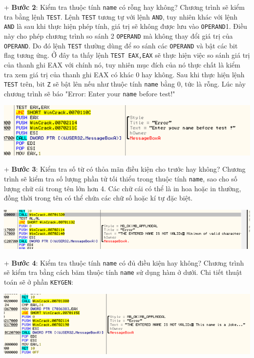 + \textbf{Bước 2}: Kiểm tra thuộc tính \texttt{name} có rỗng hay không? Chương trình sẽ kiểm tra bằng lệnh \texttt{TEST}. Lệnh \texttt{TEST} tương tự với lệnh \texttt{AND}, tuy nhiên khác với lệnh \texttt{AND} là sau khi thực hiện phép tính, giá trị sẽ không được lưu vào \texttt{OPERAND}1. Điều này cho phép chương trình so sánh 2 \texttt{OPERAND} mà không thay đổi giá trị của \texttt{OPERAND}. Do đó lệnh \texttt{TEST} thường dùng để so sánh các \texttt{OPERAND} và bật các bit flag tương ứng. Ở đây ta thấy lệnh \texttt{TEST EAX,EAX} sẽ thực hiện việc so sánh giá trị của thanh ghi EAX với chính nó, tuy nhiên mục đích của nó thực chất là kiểm tra xem giá trị của thanh ghi EAX có khác 0 hay không. Sau khi thực hiện lệnh \texttt{TEST} trên, bit \texttt{Z} sẽ bật lên nếu như thuộc tính \texttt{name} bằng 0, tức là rỗng. Lúc này chương trình sẽ báo "Error: Enter your \texttt{name} before test!"\\
\begin{center}
    \includegraphics[width=\textwidth]{img/file-2/asm4.PNG}
\end{center}
+ \textbf{Bước 3}: Kiểm tra số từ có thỏa mãn điều kiện cho trước hay không? Chương trình sẽ kiểm tra số lượng phần tử tối thiểu trong thuộc tính \texttt{name}, sao cho số lượng chữ cái trong tên lớn hơn 4. Các chữ cái có thể là in hoa hoặc in thường, đồng thời trong tên có thể chứa các chữ số hoặc kí tự đặc biệt.\\
\begin{center}
    \includegraphics[width=\textwidth]{img/file-2/asm5.PNG}
\end{center}
+ \textbf{Bước 4}: Kiểm tra thuộc tính \texttt{name} có đủ điều kiện hay không?
Chương trình sẽ kiểm tra bằng cách băm thuộc tính \texttt{name} sử dụng hàm ở dưới. Chi tiết thuật toán sẽ ở phần \texttt{KEYGEN}:\\
\begin{center}
    \includegraphics[width=\textwidth]{img/file-2/asm6.PNG}
\end{center}
